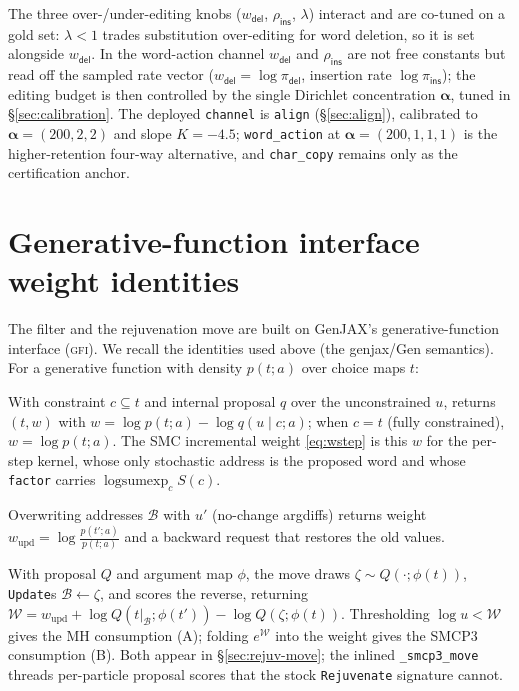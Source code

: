 \documentclass[11pt]{article}
\providecommand{\given}{\mid}
\providecommand{\insact}{\textsf{ins}}
\providecommand{\delact}{\textsf{del}}
\providecommand{\lse}{\operatorname{logsumexp}}
\providecommand{\GFI}{\textsc{gfi}}
\providecommand{\code}[1]{\texttt{#1}}
\providecommand{\wdel}{w_{\delact}}
\providecommand{\pins}{\pi_{\insact}}
\providecommand{\pdel}{\pi_{\delact}}
\begin{document}
\noindent The three over-/under-editing knobs ($\wdel$, $\rho_{\insact}$, $\lambda$) interact and are co-tuned on a gold set: $\lambda<1$ trades substitution over-editing for word deletion, so it is set alongside $\wdel$. In the word-action channel $\wdel$ and $\rho_{\insact}$ are not free constants but read off the sampled rate vector ($\wdel=\log\pdel$, insertion rate $\log\pins$); the editing budget is then controlled by the single Dirichlet concentration $\bm\alpha$, tuned in \S\ref{sec:calibration}. The deployed \code{channel} is \code{align} (\S\ref{sec:align}), calibrated to $\bm\alpha=(200,2,2)$ and slope $K=-4.5$; \code{word\_action} at $\bm\alpha=(200,1,1,1)$ is the higher-retention four-way alternative, and \code{char\_copy} remains only as the certification anchor.

\ifdefined\ncincluded\else\appendix\fi

\section{Generative-function interface weight identities}
\label{app:gfi}

The filter and the rejuvenation move are built on GenJAX's generative-function interface (\GFI). We recall the identities used above (the genjax/Gen semantics). For a generative function with density $p(t;a)$ over choice maps $t$:
\begin{description}[leftmargin=1.2em]
\item[\code{generate}/\code{importance}.] With constraint $c\subseteq t$ and internal proposal $q$ over the unconstrained $u$, returns $(t,w)$ with $w = \log p(t;a) - \log q(u\given c;a)$; when $c=t$ (fully constrained), $w = \log p(t;a)$. The SMC incremental weight \eqref{eq:wstep} is this $w$ for the per-step kernel, whose only stochastic address is the proposed word and whose \code{factor} carries $\lse_c S(c)$.
\item[\code{edit}/\code{Update}.] Overwriting addresses $\mathcal B$ with $u'$ (no-change argdiffs) returns weight $w_{\mathrm{upd}} = \log\frac{p(t';a)}{p(t;a)}$ and a backward request that restores the old values.
\item[\code{Rejuvenate} (SMCP3).] With proposal $Q$ and argument map $\phi$, the move draws $\zeta\sim Q(\cdot;\phi(t))$, \code{Update}s $\mathcal B\gets\zeta$, and scores the reverse, returning $\mathcal W = w_{\mathrm{upd}} + \log Q(t|_{\mathcal B};\phi(t')) - \log Q(\zeta;\phi(t))$. Thresholding $\log u < \mathcal W$ gives the MH consumption (A); folding $e^{\mathcal W}$ into the weight gives the SMCP3 consumption (B). Both appear in \S\ref{sec:rejuv-move}; the inlined \code{\_smcp3\_move} threads per-particle proposal scores that the stock \code{Rejuvenate} signature cannot.
\end{description}
\end{document}
